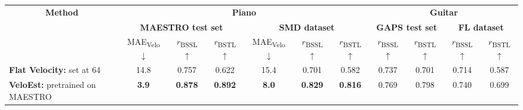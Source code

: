 \documentclass{article}
\begin{document}
\begin{table}[htbp]
    \centering
    \setlength{\tabcolsep}{2.6pt}
    \small
    \renewcommand{\arraystretch}{1.2}
    \begin{tabular}{l||ccc|ccc||cc|cc}
        \toprule
        \multicolumn{1}{c||}{\multirow{2}{*}{\textbf{Method}}}
        & \multicolumn{6}{c||}{\textbf{Piano}}
        & \multicolumn{4}{c}{\textbf{Guitar}} \\
        \cmidrule(lr){2-7} \cmidrule(l){8-11}
        & \multicolumn{3}{c|}{\textbf{MAESTRO test set}}
        & \multicolumn{3}{c||}{\textbf{SMD dataset}}
        & \multicolumn{2}{c|}{\textbf{GAPS test set}}
        & \multicolumn{2}{c}{\textbf{FL dataset}} \\
        \cmidrule(lr){2-4} \cmidrule(lr){5-7} \cmidrule(lr){8-9} \cmidrule(l){10-11}
        & MAE\textsubscript{Velo} $\downarrow$
        & $r$\textsubscript{BSSL} $\uparrow$
        & $r$\textsubscript{BSTL} $\uparrow$
        & MAE\textsubscript{Velo} $\downarrow$
        & $r$\textsubscript{BSSL} $\uparrow$
        & $r$\textsubscript{BSTL} $\uparrow$
        & $r$\textsubscript{BSSL} $\uparrow$
        & $r$\textsubscript{BSTL} $\uparrow$
        & $r$\textsubscript{BSSL} $\uparrow$
        & $r$\textsubscript{BSTL} $\uparrow$ \\
        \midrule
        \textbf{Flat Velocity:} set at 64 & 14.8 & 0.757 & 0.622 & 15.4 & 0.701 & 0.582 & 0.737 & 0.701 & 0.714 & 0.587 \\
        \textbf{VeloEst:} pretrained on MAESTRO
        & \textbf{3.9} & \textbf{0.878} & \textbf{0.892}
        & \textbf{8.0} & \textbf{0.829} & \textbf{0.816}
        & 0.769 & 0.798 & 0.740 & 0.699 \\
        

\end{tabular}
\end{table}
\end{document}
